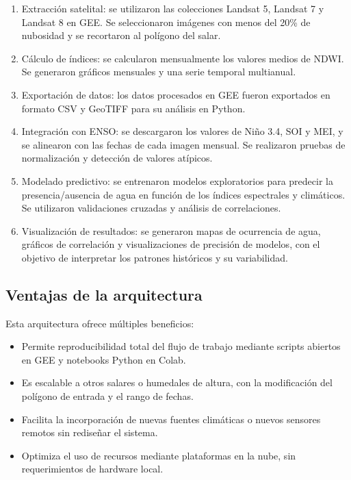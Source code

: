 \begin{enumerate}
    \item Extracción satelital: se utilizaron las colecciones Landsat 5, Landsat 7 y Landsat 8 en GEE. Se seleccionaron imágenes con menos del 20\% de nubosidad y se recortaron al polígono del salar.

    \item Cálculo de índices: se calcularon mensualmente los valores medios de NDWI. Se generaron gráficos mensuales y una serie temporal multianual.

    \item Exportación de datos: los datos procesados en GEE fueron exportados en formato CSV y GeoTIFF para su análisis en Python.

    \item Integración con ENSO: se descargaron los valores de Niño 3.4, SOI y MEI, y se alinearon con las fechas de cada imagen mensual. Se realizaron pruebas de normalización y detección de valores atípicos.

    \item Modelado predictivo: se entrenaron modelos exploratorios para predecir la presencia/ausencia de agua en función de los índices espectrales y climáticos. Se utilizaron validaciones cruzadas y análisis de correlaciones.

    \item Visualización de resultados: se generaron mapas de ocurrencia de agua, gráficos de correlación y visualizaciones de precisión de modelos, con el objetivo de interpretar los patrones históricos y su variabilidad.
\end{enumerate}


\subsection*{Ventajas de la arquitectura}

Esta arquitectura ofrece múltiples beneficios:

\begin{itemize}
    \item Permite reproducibilidad total del flujo de trabajo mediante scripts abiertos en GEE y notebooks Python en Colab.
    \item Es escalable a otros salares o humedales de altura, con la modificación del polígono de entrada y el rango de fechas.
    \item Facilita la incorporación de nuevas fuentes climáticas o nuevos sensores remotos sin rediseñar el sistema.
    \item Optimiza el uso de recursos mediante plataformas en la nube, sin requerimientos de hardware local.
\end{itemize}

